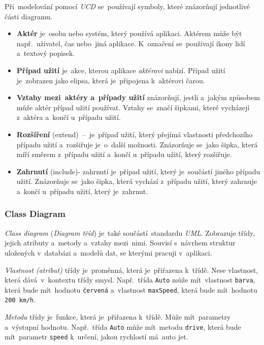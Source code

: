 \documentclass[10pt,a4paper]{article}
\begin{document}
        Při~modelování pomocí \emph{UCD} se~používají symboly, které znázorňují jednotlivé části diagramu.
        \begin{itemize}
            \item \textbf{Aktér} je~osoba nebo systém, který používá aplikaci. Aktérem může být např.~uživatel, čas nebo~jiná aplikace. K~označení se~používají ikony lidí a~textový popisek.
            \item \textbf{Případ užití} je~akce, kterou aplikace \emph{aktérovi} nabízí. Případ užití je~zobrazen jako elipsa, která je~připojena k~aktérovi čarou.
            \item \textbf{Vztahy mezi~aktéry a~případy užití} znázorňují, jestli a~jakým způsobem může aktér případ užití používat. Vztahy se~značí šipkami, které vycházejí z~aktéra a~končí u~případu užití.
            \item \textbf{Rozšíření} (extend)~--~je~případ užití, který přejímá vlastnosti předchozího případu užití a~rozšiřuje je~o~další možnosti. Znázorňuje se~jako šipka, která míří směrem z~případu užití a~končí u~případu užití, který rozšiřuje.
            \item \textbf{Zahrnutí} (include)- zahrnutí je~případ užití, který je~součástí jiného případu užití. Znázorňuje se~jako šipka, která vychází z~případu užití, který zahrnuje a~končí u~případu užití, který je~zahrnut.
        \end{itemize}

        \subsubsection{Class Diagram}
        \emph{Class diagram} (\emph{Diagram tříd}) je~také součástí~standardu \emph{UML}. Zobrazuje třídy, jejich atributy a~metody a~vztahy mezi~nimi. Souvisí s~návrhem struktur uložených v~databázi a~modelů dat, se kterými pracuji v~aplikaci.

        \emph{Vlastnost (atribut)} třídy je~proměnná, která je~přiřazena k~třídě. Nese vlastnost, která dává~v~kontextu třídy smysl. Např.~třída \texttt{Auto} může mít~vlastnost \texttt{barva}, která bude mít~hodnotu \texttt{červená} a~vlastnost \texttt{maxSpeed}, která bude mít~hodnotu \texttt{200 km/h}.

        \emph{Metoda} třídy je~funkce, která je~přiřazena k~třídě. Může mít~parametry a~výstupní hodnotu. Např.~třída \texttt{Auto} může mít~metodu \texttt{drive}, která bude mít~parametr \texttt{speed} k~určení, jakou rychlostí má~auto jet.
        
\end{document}
